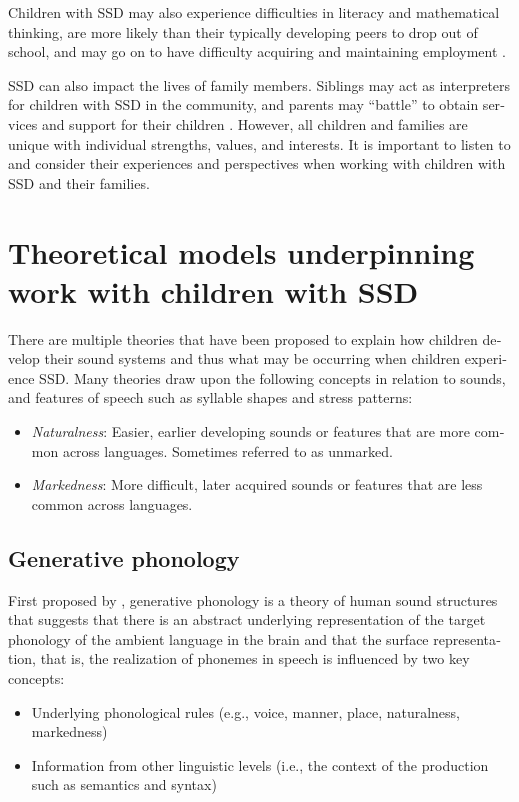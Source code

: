 \documentclass[output=paper,colorlinks,citecolor=brown]{langscibook}
\begin{document}
\begin{otherlanguage}{english}
Children with SSD may also experience difficulties in literacy and mathematical thinking, are more likely than their typically developing peers to drop out of school, and may go on to have difficulty acquiring and maintaining employment \citep{Anthony2011, Felsenfeld1994, Robertson1998, Ruben2000, Tambyraja2020}. 

SSD can also impact the lives of family members. Siblings may act as interpreters for children with SSD in the community, and parents may “battle” to obtain services and support for their children \citep{Barr2008, McCormack2012, McGill2020}. However, all children and families are unique with individual strengths, values, and interests. It is important to listen to and consider their experiences and perspectives when working with children with SSD and their families.

\section{Theoretical models underpinning work with children with SSD}
There are multiple theories that have been proposed to explain how children develop their sound systems and thus what may be occurring when children experience SSD. Many theories draw upon the following concepts in relation to sounds, and features of speech such as syllable shapes and stress patterns:

\begin{itemize}
    \item \emph{Naturalness}: Easier, earlier developing sounds or features that are more common across languages. Sometimes referred to as unmarked. 
\item	\emph{Markedness}: More difficult, later acquired sounds or features that are less common across languages. 
\end{itemize}

\subsection*{Generative phonology}
First proposed by \citet{Chomsky1968}, generative phonology is a theory of human sound structures that suggests that there is an abstract underlying representation of the target phonology of the ambient language in the brain and that the surface representation, that is, the realization of phonemes in speech is influenced by two key concepts:

\begin{itemize}
    \item Underlying phonological rules (e.g., voice, manner, place, naturalness, mar\-kedness)
\item	Information from other linguistic levels (i.e., the context of the production such as semantics and syntax)
\end{itemize}


\end{otherlanguage}
\end{document}
